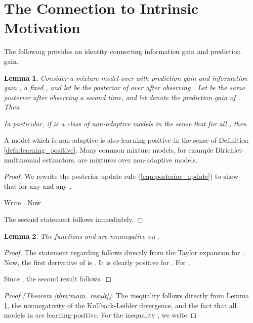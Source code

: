 \documentclass{article}
\newtheorem{lem}{Lemma}
\newcommand{\eqnref}[1]{(\ref{eqn:#1})}
\newcommand{\noappendix}[1]{#1}
\begin{document}

\begin{small}

\end{small}

\noappendix{
\appendix

\section{The Connection to Intrinsic Motivation}

The following provides an identity connecting information gain and prediction gain.
\begin{lem}\label{lem:identity_ipd_ig}
Consider a mixture model  over  with prediction gain  and information gain , a fixed , and let  be the posterior of  over  after observing . Let  be the same posterior after observing  a second time, and let  denote the prediction gain of . Then

In particular, if  is a class of non-adaptive models in the sense that  for all , then

\end{lem}

A model which is non-adaptive is also learning-positive in the sense of Definition \ref{defn:learning_positive}. Many common mixture models, for example Dirichlet-multinomial estimators, are mixtures over non-adaptive models.

\begin{proof}
We rewrite the posterior update rule \eqnref{posterior_update} to show that for any  and any ,

Write . Now

The second statement follows immediately.
\end{proof}

\begin{lem}\label{lem:logarithmic_inequality}
The functions  and  are nonnegative on .
\end{lem}
\begin{proof}
The statement regarding  follows directly from the Taylor expansion for . Now, the first derivative of  is . It is clearly positive for . For ,

Since , the second result follows.
\end{proof}
\begin{proof}[Proof (Theorem \ref{thm:main_result})]
The inequality  follows directly from Lemma \ref{lem:identity_ipd_ig}, 
the nonnegativity of the Kullback-Leibler divergence, and the fact that all models in  are learning-positive. For the inequality ,
we write 


\end{proof}}
\end{document}
